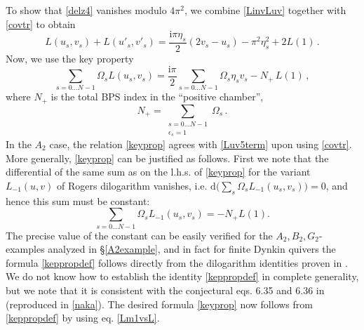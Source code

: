 \documentclass[12pt,reqno]{article}
\numberwithin{equation}{section}
\newcommand{\be}{\begin{equation}}
\newcommand{\ee}{\end{equation}}
\def\eps{\varepsilon}
\newcommand{\de}{\mathrm{d}}
\newcommand{\I}{\mathrm{i}}
\def\eps{\epsilon}
\numberwithin{equation}{section}
\begin{document}
To show that \eqref{delz4} vanishes modulo $4\pi^2$, we combine \eqref{LinvLuv} together with \eqref{covtr} to obtain
\be
\label{funclm3}
L(u_s,v_s)+L(u'_s,v'_s)=\frac{\I\pi\eta_s}{2}(2v_s-u_s)-{\pi^2} \eta_s^2 +2 L(1)\, .
\ee
Now, we use the key property
\be
 \sum_{s=0\dots N-1}\Omega_s L(u_s,v_s) =\frac{\I\pi}{2} \sum_{s=0\dots N-1}\Omega_s \eta_s v_s - N_+ \,L(1)\, ,
 \label{keyprop}
\ee
where $N_+$ is the total BPS index in the ``positive chamber'',
\be
N_+= \sum_{\substack{s=0\dots N-1\\ \eps_s=1}} \Omega_{s}\, .
\ee
In the $A_2$ case, the relation \eqref{keyprop} agrees with \eqref{Luv5term} upon using \eqref{covtr}.
More generally, \eqref{keyprop} can be justified as follows. First we note that the differential of
the same sum as on the l.h.s. of \eqref{keyprop} for the variant $L_{-1}(u,v)$ of Rogers dilogarithm
vanishes, i.e. $\de\big(\sum_{s} \Omega_s L_{-1}(u_s, v_s)\big)=0$, and hence this sum must be constant:
\be
\sum_{s=0\dots N-1}\Omega_s L_{-1}(u_s, v_s)=- N_+ L(1).
\label{keppropdef}
\ee
The precise value of the constant can be easily verified for the $A_2, B_2, G_2$-examples analyzed in \S\ref{A2example}, and in
fact for finite Dynkin quivers the formula \eqref{keppropdef} follows directly from the dilogarithm
identities proven in \cite{Nakanishi:2010,Keller:2010,Keller:2010b}. We do not know how to establish the identity \eqref{keppropdef}
in complete generality, but we note that it is consistent with the conjectural
eqs. 6.35 and 6.36 in \cite{Nakanishi:2010} (reproduced in \eqref{naka}).
The desired formula \eqref{keyprop} now follows from \eqref{keppropdef} by using eq. \eqref{Lm1vsL}.
\end{document}
